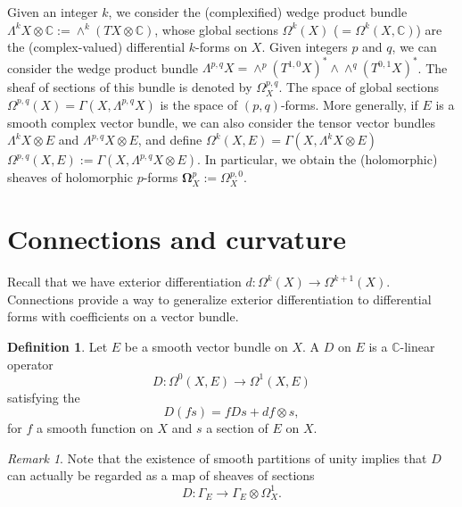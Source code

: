 \documentclass[12pt,a4paper]{amsbook}
\theoremstyle{remark} \newtheorem{rmk}[thm]{Remark}
\theoremstyle{definition} \newtheorem{defn}[thm]{Definition}
\theoremstyle{definition} \newtheorem{ex}[thm]{Example}
\theoremstyle{definition} \newtheorem{ej}{Exercise}
\let\emph\relax
\newcommand{\C}{\mathbb C}
\begin{document}
Given an integer $k$, we consider the (complexified) wedge product bundle $\Lambda^kX \otimes \C := \wedge^k (TX\otimes \C)$, whose global sections $\Omega^k(X)$ ($=\Omega^k(X,\C)$) are the (complex-valued) differential $k$-forms on $X$.
Given integers $p$ and $q$, we can consider the wedge product bundle $\Lambda^{p,q} X=\wedge^p (T^{1,0}X)^* \wedge \wedge^q(T^{0,1}X)^*$. The sheaf of sections of this bundle is denoted by $\Omega^{p,q}_X$. The space of global sections $\Omega^{p,q}(X)=\Gamma(X,\Lambda^{p,q}X)$ is the space of $(p,q)$-forms. More generally, if $E$ is a smooth complex vector bundle, we can also consider the tensor vector bundles $\Lambda^k X\otimes E$ and $\Lambda^{p,q} X \otimes E$, and define $\Omega^k(X,E)=\Gamma(X,\Lambda^k X\otimes E)$ $\Omega^{p,q}(X,E):= \Gamma(X,\Lambda^{p,q} X \otimes E)$. In particular, we obtain the (holomorphic) sheaves of holomorphic $p$-forms $\bm{\Omega}^p_X := \Omega^{p,0}_X$.

\section{Connections and curvature}
Recall that we have exterior differentiation $d:\Omega^k(X)\rightarrow \Omega^{k+1}(X)$. Connections provide a way to generalize exterior differentiation to differential forms with coefficients on a vector bundle.

 \begin{defn}
Let $E$ be a smooth vector bundle on $X$. A \emph{connection} $D$ on $E$ is a  $\C$-linear operator 
\begin{equation*}
D: \Omega^0(X,E) \rightarrow \Omega^1(X,E)
\end{equation*} 
satisfying the \emph{Leibniz rule}
\begin{equation*}
D(fs)= fD s + df \otimes s,
\end{equation*} 
for $f$ a smooth function on $X$ and $s$ a section of $E$ on $X$.
\end{defn}

\begin{rmk}
Note that the existence of smooth partitions of unity implies that $D$ can actually be regarded as a map of sheaves of sections
\begin{equation*}
D: \Gamma_E \rightarrow \Gamma_E \otimes \Omega^1_X.
\end{equation*} 
\end{rmk}
\end{document}
